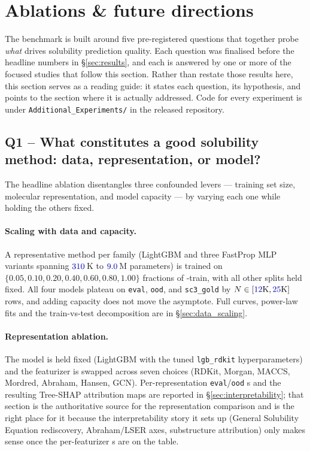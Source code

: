 \section{Ablations \& future directions}
\label{sec:ablations}

The benchmark is built around five pre-registered questions that
together probe \emph{what} drives solubility prediction quality.  Each
question was finalised before the headline numbers in
§\ref{sec:results}, and each is answered by one or more of the focused
studies that follow this section.  Rather than restate those results
here, this section serves as a reading guide: it states each question,
its hypothesis, and points to the section where it is actually
addressed.  Code for every experiment is under
\texttt{Additional\_Experiments/} in the released repository.

\subsection{Q1 -- What constitutes a good solubility method: data, representation, or model?}
\label{sec:ablations_q1}

The headline ablation disentangles three confounded levers --- training
set size, molecular representation, and model capacity --- by varying
each one while holding the others fixed.

\paragraph{Scaling with data and capacity.}
A representative method per family (LightGBM and three FastProp MLP
variants spanning $\numval{310}$\,K to $\numval{9.0}$\,M parameters) is
trained on $\{0.05, 0.10, 0.20, 0.40, 0.60, 0.80, 1.00\}$ fractions of
\scthree-train, with all other splits held fixed.  All four models
plateau on \texttt{eval}, \texttt{ood}, and \texttt{sc3\_gold} by
$N \in [\numval{12}\text{K}, \numval{25}\text{K}]$ rows, and adding
capacity does not move the asymptote.  Full curves, power-law fits and
the train-vs-test decomposition are in §\ref{sec:data_scaling}.

\paragraph{Representation ablation.}
The model is held fixed (LightGBM with the tuned \texttt{lgb\_rdkit}
hyperparameters) and the featurizer is swapped across seven choices
(RDKit, Morgan, MACCS, Mordred, Abraham, Hansen, GCN).  Per-representation
\texttt{eval}/\texttt{ood} \RMSE{}s and the resulting Tree-SHAP attribution
maps are reported in §\ref{sec:interpretability}; that section is the
authoritative source for the representation comparison and is the
right place for it because the interpretability story it sets up
(General Solubility Equation rediscovery, Abraham/LSER axes,
substructure attribution) only makes sense once the per-featurizer
\RMSE{}s are on the table.

